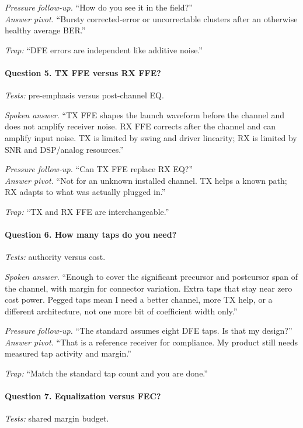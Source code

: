 \textit{Pressure follow-up.} ``How do you see it in the field?''\\
\textit{Answer pivot.} ``Bursty corrected-error or uncorrectable clusters after
an otherwise healthy average BER.''

\textit{Trap:} ``DFE errors are independent like additive noise.''

\paragraph{Question 5. TX FFE versus RX FFE?}
\textit{Tests:} pre-emphasis versus post-channel EQ.

\textit{Spoken answer.}
``TX FFE shapes the launch waveform before the channel and does not amplify
receiver noise. RX FFE corrects after the channel and can amplify input noise.
TX is limited by swing and driver linearity; RX is limited by SNR and DSP/analog
resources.''

\textit{Pressure follow-up.} ``Can TX FFE replace RX EQ?''\\
\textit{Answer pivot.} ``Not for an unknown installed channel. TX helps a known
path; RX adapts to what was actually plugged in.''

\textit{Trap:} ``TX and RX FFE are interchangeable.''

\paragraph{Question 6. How many taps do you need?}
\textit{Tests:} authority versus cost.

\textit{Spoken answer.}
``Enough to cover the significant precursor and postcursor span of the channel,
with margin for connector variation. Extra taps that stay near zero cost power.
Pegged taps mean I need a better channel, more TX help, or a different
architecture, not one more bit of coefficient width only.''

\textit{Pressure follow-up.} ``The standard assumes eight DFE taps. Is that my
design?''\\
\textit{Answer pivot.} ``That is a reference receiver for compliance. My product
still needs measured tap activity and margin.''

\textit{Trap:} ``Match the standard tap count and you are done.''

\paragraph{Question 7. Equalization versus FEC?}
\textit{Tests:} shared margin budget.

